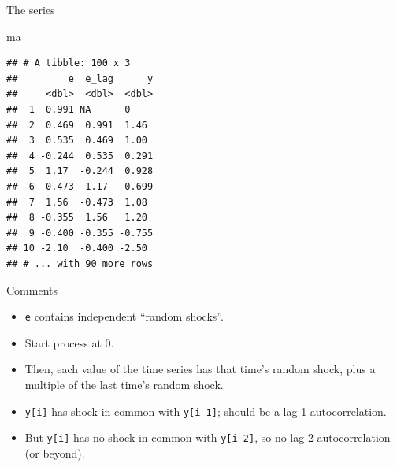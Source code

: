 \documentclass[
  ignorenonframetext,
]{beamer}
\newenvironment{Shaded}{\begin{snugshade}}{\end{snugshade}}
\newcommand{\NormalTok}[1]{#1}
\providecommand{\tightlist}{%
  \setlength{\itemsep}{0pt}\setlength{\parskip}{0pt}}
\begin{document}
\begin{frame}[fragile]{The series}
\protect\hypertarget{the-series}{}

\small

\begin{Shaded}
\begin{Highlighting}[]
\NormalTok{ma}
\end{Highlighting}
\end{Shaded}

\begin{verbatim}
## # A tibble: 100 x 3
##         e  e_lag      y
##     <dbl>  <dbl>  <dbl>
##  1  0.991 NA      0    
##  2  0.469  0.991  1.46 
##  3  0.535  0.469  1.00 
##  4 -0.244  0.535  0.291
##  5  1.17  -0.244  0.928
##  6 -0.473  1.17   0.699
##  7  1.56  -0.473  1.08 
##  8 -0.355  1.56   1.20 
##  9 -0.400 -0.355 -0.755
## 10 -2.10  -0.400 -2.50 
## # ... with 90 more rows
\end{verbatim}

\normalsize

\end{frame}

\begin{frame}[fragile]{Comments}
\protect\hypertarget{comments-48}{}

\begin{itemize}
\tightlist
\item
  \texttt{e} contains independent ``random shocks''.
\item
  Start process at 0.
\item
  Then, each value of the time series has that time's random shock, plus
  a multiple of the last time's random shock.
\item
  \texttt{y{[}i{]}} has shock in common with \texttt{y{[}i-1{]}}; should
  be a lag 1 autocorrelation.
\item
  But \texttt{y{[}i{]}} has no shock in common with \texttt{y{[}i-2{]}},
  so no lag 2 autocorrelation (or beyond).
\end{itemize}

\end{frame}
\end{document}
